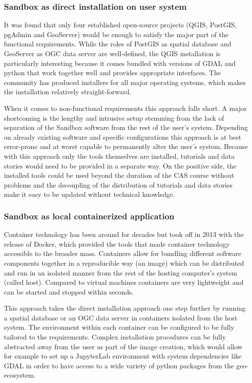\documentclass[11pt, a4paper, oneside, parskip=full-]{scrartcl}
\begin{document}
\subsubsection*{Sandbox as direct installation on user system}
It was found that only four established open-source projects (QGIS, PostGIS,
pgAdmin\cite{pgadmin} and GeoServer\cite{geoserver}) would be enough to satisfy
the major part of the functional requirements. While the roles of PostGIS as
spatial database and GeoServer as OGC data server are well-defined, the QGIS
installation is particularly interesting because it comes bundled with versions
of GDAL\cite{gdal} and python that work together well and provides appropriate
interfaces. The community has produced installers for all major operating
systems, which makes the installation relatively straight-forward.

When it comes to non-functional requirements this approach falls short. A major
shortcoming is the lengthy and intrusive setup stemming from the lack of
separation of the Sandbox software from the rest of the user's system. Depending
on already existing software and specific configurations this approach is at
best error-prone and at worst capable to permanently alter the user's system.
Because with this approach only the tools themselves are installed, tutorials
and data stories would need to be provided in a separate way. On the positive
side, the installed tools could be used beyond the duration of the CAS course
without problems and the decoupling of the distribution of tutorials and data
stories make it easy to be updated without technical knowledge.

\subsubsection*{Sandbox as local containerized application}
Container technology has been around for decades but took off in 2013 with the
release of Docker, which provided the tools that made container technology
accessible to the broader mass. Containers allow for bundling different software
components together in a reproducible way (an image) which can be distributed
and run in an isolated manner from the rest of the hosting computer's system
(called host). Compared to virtual machines containers are very lightweight and
can be started and stopped within seconds.

This approach takes the direct installation approach one step further by running
a spatial database or an OGC data server in containers isolated from the host
system. The environment within each container can be configured to be fully
tailored to the requirements. Complex installation procedures can be fully
abstracted away from the user as part of the image creation, which would allow
for example to set up a JupyterLab environment with system dependencies like
GDAL in order to have access to a wide variety of python packages from the
geo-ecosystem.
\end{document}
